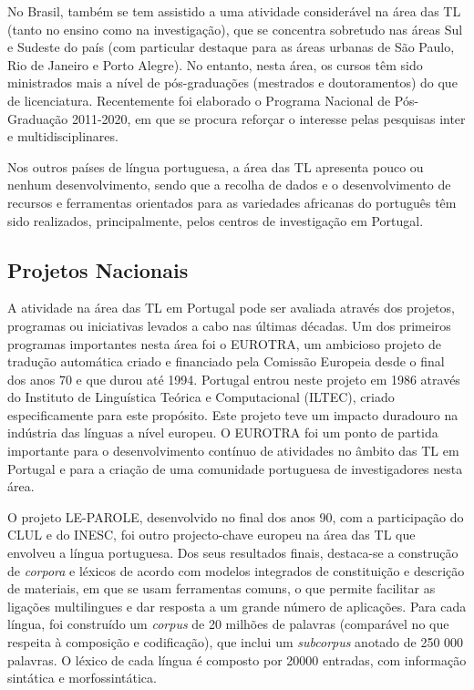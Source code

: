 \begin{multicols}{2}
No Brasil, também se tem assistido a uma atividade considerável na área das TL (tanto no ensino como na investigação), que se concentra sobretudo nas áreas Sul e Sudeste do país (com particular destaque para as áreas urbanas de São Paulo, Rio de Janeiro e Porto Alegre). No entanto, nesta área, os cursos têm sido ministrados mais a nível de pós-graduações (mestrados e doutoramentos) do que de licenciatura. Recentemente foi elaborado o Programa Nacional de Pós-Graduação 2011-2020, em que se procura reforçar o interesse pelas pesquisas inter e multidisciplinares.

Nos outros países de língua portuguesa, a área das TL apresenta pouco ou nenhum desenvolvimento, sendo que a recolha de dados e o desenvolvimento de recursos e ferramentas orientados para as variedades africanas do português têm sido realizados, principalmente, pelos centros de investigação em Portugal.

\subsection{Projetos Nacionais}

 A atividade na área das TL em Portugal pode ser avaliada através dos projetos, programas ou iniciativas levados a cabo nas últimas décadas. Um dos primeiros programas importantes nesta área foi o EUROTRA, um ambicioso projeto de tradução automática criado e financiado pela Comissão Europeia desde o final dos anos 70 e que durou até 1994. Portugal entrou neste projeto em 1986 através do Instituto de Linguística Teórica e Computacional (ILTEC), criado especificamente para este propósito. Este projeto teve um impacto duradouro na indústria das línguas a nível europeu. O EUROTRA foi um ponto de partida importante para o desenvolvimento contínuo de atividades no âmbito das TL em Portugal e para a criação de uma comunidade portuguesa de investigadores nesta área.

O projeto LE-PAROLE, desenvolvido no final dos anos 90, com a participação do CLUL e do INESC, foi outro projecto-chave europeu na área das TL que envolveu a língua portuguesa. Dos seus resultados finais, destaca-se a construção de \textit{corpora} e léxicos de acordo com modelos integrados de constituição e descrição de materiais, em que se usam ferramentas comuns, o que permite facilitar as ligações multilingues e dar resposta a um grande número de aplicações. Para cada língua, foi construído um \textit{corpus} de 20 milhões de palavras (comparável no que res\-pei\-ta à composição e codificação), que inclui um \textit{subcorpus} anotado de 250 000 palavras. O léxico de cada língua é composto por 20000 entradas, com informação sintática e morfossintática.


\end{multicols}
